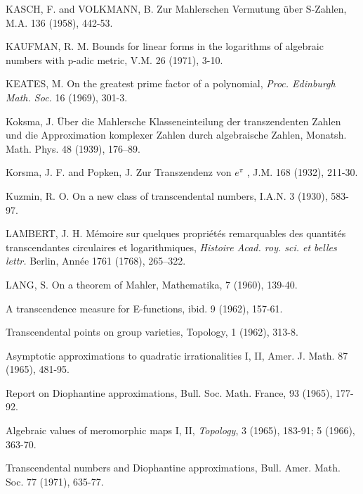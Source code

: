 \begin{hanglist}
    \item KASCH, F. and VOLKMANN, B. Zur Mahlerschen Vermutung über S-Zahlen, M.A. 136 (1958), 442-53.
    \item KAUFMAN, R. M. Bounds for linear forms in the logarithms of algebraic numbers with p-adic metric, V.M. 26 (1971), 3-10.
    \item KEATES, M. On the greatest prime factor of a polynomial, \textit{Proc. Edinburgh Math. Soc.} 16 (1969), 301-3.
    \item Koksma, J. Über die Mahlersche Klasseneinteilung der transzendenten Zahlen und die Approximation komplexer Zahlen durch algebraische Zahlen, Monatsh. Math. Phys. 48 (1939), 176–89.
    \item Korsma, J. F. and Popken, J. Zur Transzendenz von  $e^{\pi}$ , J.M. 168 (1932), 211-30.
    \item Kuzmin, R. O. On a new class of transcendental numbers, I.A.N. 3 (1930), 583-97.
    \item LAMBERT, J. H. Mémoire sur quelques propriétés remarquables des quantités transcendantes circulaires et logarithmiques, \textit{Histoire Acad. roy. sci. et belles lettr.} Berlin, Année 1761 (1768), 265–322.
    \item LANG, S. On a theorem of Mahler, Mathematika, 7 (1960), 139-40.
    \item \hspace{1.5em} A transcendence measure for E-functions, ibid. 9 (1962), 157-61.
    \item \hspace{1.5em} Transcendental points on group varieties, Topology, 1 (1962), 313-8.
    \item \hspace{1.5em} Asymptotic approximations to quadratic irrationalities I, II, Amer. J. Math. 87 (1965), 481-95.
    \item \hspace{1.5em} Report on Diophantine approximations, Bull. Soc. Math. France, 93 (1965), 177-92.
    \item \hspace{1.5em} Algebraic values of meromorphic maps I, II, \textit{Topology}, 3 (1965), 183-91; 5 (1966), 363-70.
    \item \hspace{1.5em} Transcendental numbers and Diophantine approximations, Bull. Amer. Math. Soc. 77 (1971), 635-77.

\end{hanglist}
